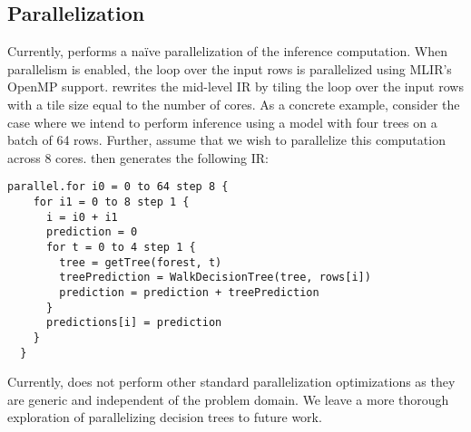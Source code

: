 \subsection{Parallelization}
Currently, \Treebeard{} performs a na\"ive parallelization of the inference computation. When parallelism is enabled, the 
loop over the input rows is parallelized using MLIR's OpenMP support. \Treebeard{} rewrites 
the mid-level IR by tiling the loop over the input rows with a tile size equal to the number of cores. 
As a concrete example, consider the case where we intend to perform inference 
using a model with four trees on a batch of 64 rows. Further, assume that we 
wish to parallelize this computation across 8 cores.  \Treebeard{} then 
generates the following IR:
\begin{lstlisting}[style=c++]
  parallel.for i0 = 0 to 64 step 8 {
    for i1 = 0 to 8 step 1 {
      i = i0 + i1
      prediction = 0
      for t = 0 to 4 step 1 {
        tree = getTree(forest, t) 
        treePrediction = WalkDecisionTree(tree, rows[i])
        prediction = prediction + treePrediction
      }
      predictions[i] = prediction
    }
  }
\end{lstlisting}
Currently, \Treebeard{} does not perform other standard parallelization 
optimizations as they are generic and independent of the 
problem domain. We leave a more thorough exploration of parallelizing decision 
trees to future work.
